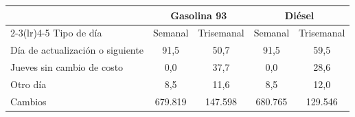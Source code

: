 \begin{tabular}{lcccc}
\toprule
 & \multicolumn{2}{c}{Gasolina 93} & \multicolumn{2}{c}{Diésel} \\
\cmidrule(lr){2-3}\cmidrule(lr){4-5}
Tipo de día & Semanal & Trisemanal & Semanal & Trisemanal \\
\midrule
Día de actualización o siguiente & 91{,}5 & 50{,}7 & 91{,}5 & 59{,}5 \\
Jueves sin cambio de costo & 0{,}0 & 37{,}7 & 0{,}0 & 28{,}6 \\
Otro día & 8{,}5 & 11{,}6 & 8{,}5 & 12{,}0 \\
\midrule
Cambios & 679.819 & 147.598 & 680.765 & 129.546 \\
\bottomrule
\end{tabular}
